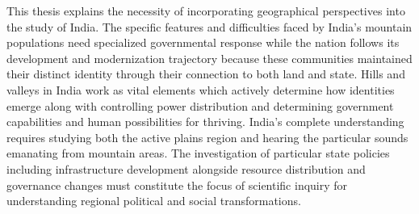 \begin{sloppypar}
\vspace{0.3cm}

This thesis explains the necessity of incorporating geographical perspectives into the study of India. The specific features and difficulties faced by India's mountain populations need specialized governmental response while the nation follows its development and modernization trajectory because these communities maintained their distinct identity through their  connection to both land and state. Hills and valleys in India work as vital elements which actively determine how identities emerge along with controlling power distribution and determining government capabilities and human possibilities for thriving. India's complete understanding requires studying both the active plains region and hearing the particular sounds emanating from mountain areas.  The investigation of particular state policies including infrastructure development alongside resource distribution and governance changes must constitute the focus of scientific inquiry for understanding regional political and social transformations.

\end{sloppypar}